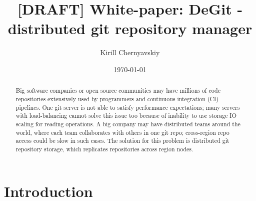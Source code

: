 \documentclass[acmlarge, screen, nonacm]{acmart}
\date{\small\today}
\title[DeGit white paper]{[DRAFT] White-paper: DeGit - distributed git repository manager}
\author{Kirill Chernyavskiy}
\begin{document}
\raggedbottom

\begin{abstract}
  Big software companies or open source communities 
  may have millions of code repositories extensively used by programmers and continuous integration (CI) pipelines.
	One git server is not able to satisfy performance expectations;
	many servers with load-balancing cannot solve this issue too because
	of inability to use storage IO scaling for reading operations.
  A big company may have distributed teams around the world,
  where each team collaborates with others in one git repo;
  cross-region repo access could be slow in such cases.
  The solution for this problem is distributed git repository storage,
  which replicates repositories across region nodes.
\end{abstract}

\maketitle

\section{Introduction}
\end{document}
